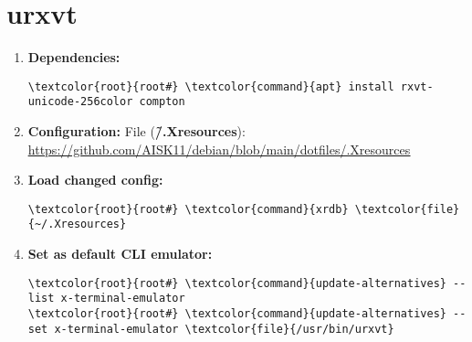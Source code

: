 \documentclass[10pt, a4paper, onecolumn, openany]{book} %
\begin{document}
\section{urxvt}
\begin{enumerate}
    \item \textbf{Dependencies:}
\begin{Verbatim}[commandchars=\\\{\}]
\textcolor{root}{root#} \textcolor{command}{apt} install rxvt-unicode-256color compton
\end{Verbatim}
    \item \textbf{Configuration:}
\newline File (\textbf{\textcolor{file}{\~/.Xresources}}):
\newline \underline{\url{https://github.com/AISK11/debian/blob/main/dotfiles/.Xresources}}
    \item \textbf{Load changed config:}
\begin{Verbatim}[commandchars=\\\{\}]
\textcolor{root}{root#} \textcolor{command}{xrdb} \textcolor{file}{~/.Xresources}
\end{Verbatim}
    \item \textbf{Set as default CLI emulator:}
\begin{Verbatim}[commandchars=\\\{\}]
\textcolor{root}{root#} \textcolor{command}{update-alternatives} --list x-terminal-emulator
\textcolor{root}{root#} \textcolor{command}{update-alternatives} --set x-terminal-emulator \textcolor{file}{/usr/bin/urxvt}
\end{Verbatim}
\end{enumerate}
\end{document}
